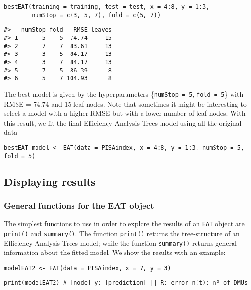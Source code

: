 \begin{verbatim}
bestEAT(training = training, test = test, x = 4:8, y = 1:3, 
        numStop = c(3, 5, 7), fold = c(5, 7))
\end{verbatim}

\begin{verbatim}
#>   numStop fold   RMSE leaves
#> 1       5    5  74.74     15
#> 2       7    7  83.61     13
#> 3       3    5  84.17     13
#> 4       3    7  84.17     13
#> 5       7    5  86.39      8
#> 6       5    7 104.93      8
\end{verbatim}

The best model is given by the hyperparameters \{\texttt{numStop\ =\ 5}, \texttt{fold\ =\ 5}\} with RMSE = 74.74 and 15 leaf nodes. Note that sometimes it might be interesting to select a model with a higher RMSE but with a lower number of leaf nodes. With this result, we fit the final Efficiency Analysis Trees model using all the original data.

\begin{verbatim}
bestEAT_model <- EAT(data = PISAindex, x = 4:8, y = 1:3, numStop = 5, fold = 5)
\end{verbatim}

\hypertarget{displaying-results}{%
\subsection{Displaying results}\label{displaying-results}}

\hypertarget{general-functions-for-the-eat-object}{%
\subsubsection{General functions for the EAT object}\label{general-functions-for-the-eat-object}}

The simplest functions to use in order to explore the results of an \texttt{EAT} object are \texttt{print()} and \texttt{summary()}. The function \texttt{print()} returns the tree-structure of an Efficiency Analysis Trees model; while the function \texttt{summary()} returns general information about the fitted model. We show the results with an example:

\begin{verbatim}
modelEAT2 <- EAT(data = PISAindex, x = 7, y = 3)
\end{verbatim}

\begin{verbatim}
print(modelEAT2) # [node] y: [prediction] || R: error n(t): nº of DMUs
\end{verbatim}

